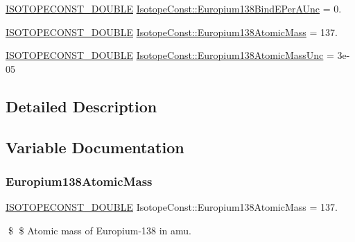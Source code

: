 \begin{DoxyCompactItemize}
\mbox{\hyperlink{group___isotope_const-_macros_ga8f45a7272ce02c0b4c65c44636ed719a}{I\+S\+O\+T\+O\+P\+E\+C\+O\+N\+S\+T\+\_\+\+D\+O\+U\+B\+LE}} \mbox{\hyperlink{group___isotope_const-_europium-_eu138_gac5f5f228ecd3d097109cca7c4d04222b}{Isotope\+Const\+::\+Europium138\+Bind\+E\+Per\+A\+Unc}} = 0.
\item 
\mbox{\hyperlink{group___isotope_const-_macros_ga8f45a7272ce02c0b4c65c44636ed719a}{I\+S\+O\+T\+O\+P\+E\+C\+O\+N\+S\+T\+\_\+\+D\+O\+U\+B\+LE}} \mbox{\hyperlink{group___isotope_const-_europium-_eu138_ga7a6eb9e6fa6fb1b32909fe0131388e0a}{Isotope\+Const\+::\+Europium138\+Atomic\+Mass}} = 137.
\item 
\mbox{\hyperlink{group___isotope_const-_macros_ga8f45a7272ce02c0b4c65c44636ed719a}{I\+S\+O\+T\+O\+P\+E\+C\+O\+N\+S\+T\+\_\+\+D\+O\+U\+B\+LE}} \mbox{\hyperlink{group___isotope_const-_europium-_eu138_ga5fad0939ec6699f59a32b7a5c2338418}{Isotope\+Const\+::\+Europium138\+Atomic\+Mass\+Unc}} = 3e-\/05
\end{DoxyCompactItemize}


\subsection{Detailed Description}


\subsection{Variable Documentation}
\mbox{\label{group___isotope_const-_europium-_eu138_ga7a6eb9e6fa6fb1b32909fe0131388e0a}} 
\subsubsection{\texorpdfstring{Europium138\+Atomic\+Mass}{Europium138AtomicMass}}
{\footnotesize\ttfamily \mbox{\hyperlink{group___isotope_const-_macros_ga8f45a7272ce02c0b4c65c44636ed719a}{I\+S\+O\+T\+O\+P\+E\+C\+O\+N\+S\+T\+\_\+\+D\+O\+U\+B\+LE}} Isotope\+Const\+::\+Europium138\+Atomic\+Mass = 137.}

\$ \$ Atomic mass of Europium-\/138 in amu. \mbox{\label{group___isotope_const-_europium-_eu138_ga5fad0939ec6699f59a32b7a5c2338418}} 
